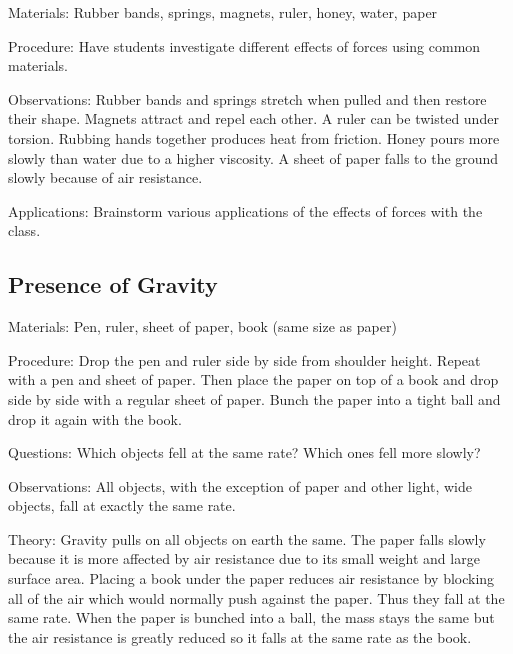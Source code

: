 \begin{multicols}{2}
\begin{description*}
\item[Materials:]{Rubber bands, springs, magnets, ruler, honey, water, paper}
\item[Procedure:]{Have students investigate different effects of forces using common materials.}
\item[Observations:]{Rubber bands and springs stretch when pulled and then restore their shape. Magnets attract and repel each other. A ruler can be twisted under torsion. Rubbing hands together produces heat from friction. Honey pours more slowly than water due to a higher viscosity. A sheet of paper falls to the ground slowly because of air resistance.}
\item[Applications:]{Brainstorm various applications of the effects of forces with the class.}
\end{description*}

\subsection{Presence of Gravity}
\begin{description*}
\item[Materials:]{Pen, ruler, sheet of paper, book (same size as paper)}
\item[Procedure:]{Drop the pen and ruler side by side from shoulder height. Repeat with a pen and sheet of paper. Then place the paper on top of a book and drop side by side with a regular sheet of paper. Bunch the paper into a tight ball and drop it again with the book.}
\item[Questions:]{Which objects fell at the same rate? Which ones fell more slowly?}
\item[Observations:]{All objects, with the exception of paper and other light, wide objects, fall at exactly the same rate.}
\item[Theory:]{Gravity pulls on all objects on earth the same.  The paper falls slowly because it is more affected by air resistance due to its small weight and large surface area. Placing a book under the paper reduces air resistance by blocking all of the air which would normally push against the paper. Thus they fall at the same rate.  When the paper is bunched into a ball, the mass stays the same but the air resistance is greatly reduced so it falls at the same rate as the book.}
\end{description*}


\end{multicols}
